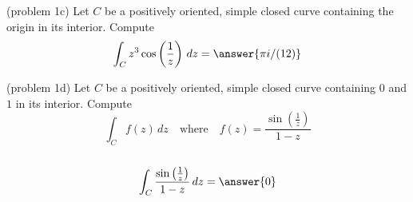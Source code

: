 \documentclass[handout]{ximera}
\begin{document}
\begin{problem}(problem 1c)
Let $C$ be a positively oriented, simple closed curve containing the origin in its interior. Compute
\[
\int_C z^3\cos\left(\frac{1}{z}\right) \, dz = \answer{\pi i/(12)}
\]

\end{problem}

\begin{problem}(problem 1d)
Let $C$ be a positively oriented, simple closed curve containing $0$ and $1$ in its interior. Compute
\[
\int_C f(z) \, dz \quad \text{where} \quad f(z) = \frac{\sin\left(\frac{1}{z}\right)}{1-z}
\]
{}\\
\[
 \int_C \frac{\sin\left(\frac{1}{z}\right)}{1-z} \, dz = \answer{0}
 \]

\end{problem}
\end{document}
